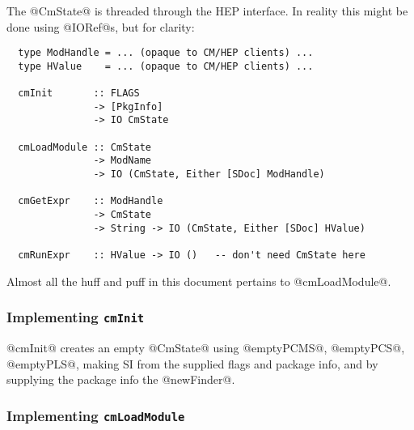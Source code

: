 \documentclass[11pt]{article}
\begin{document}
The @CmState@ is threaded through the HEP interface.  In reality
this might be done using @IORef@s, but for clarity:
\begin{verbatim}
  type ModHandle = ... (opaque to CM/HEP clients) ...
  type HValue    = ... (opaque to CM/HEP clients) ...

  cmInit       :: FLAGS 
               -> [PkgInfo]
               -> IO CmState

  cmLoadModule :: CmState 
               -> ModName 
               -> IO (CmState, Either [SDoc] ModHandle)

  cmGetExpr    :: ModHandle 
               -> CmState 
               -> String -> IO (CmState, Either [SDoc] HValue)

  cmRunExpr    :: HValue -> IO ()   -- don't need CmState here
\end{verbatim}
Almost all the huff and puff in this document pertains to @cmLoadModule@.


\subsubsection{Implementing \mbox{\tt cmInit}}
@cmInit@ creates an empty @CmState@ using @emptyPCMS@, @emptyPCS@,
@emptyPLS@, making SI from the supplied flags and package info, and 
by supplying the package info the @newFinder@.


\subsubsection{Implementing \mbox{\tt cmLoadModule}}
\end{document}
